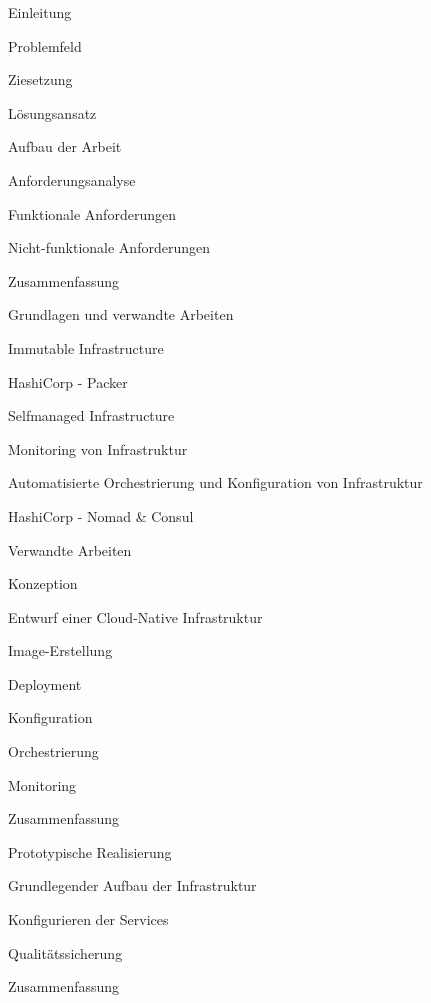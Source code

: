 \documentclass[11pt]{scrartcl}
\begin{document}
\begin{gliederung}
	\item Einleitung
	\begin{gliederung}
		\item Problemfeld
		\item Ziesetzung
		\item Lösungsansatz
		\item Aufbau der Arbeit
	\end{gliederung}

	\item Anforderungsanalyse
	\begin{gliederung}
		\item Funktionale Anforderungen
		\item Nicht-funktionale Anforderungen
		\item Zusammenfassung
	\end{gliederung}
	
	\item Grundlagen und verwandte Arbeiten
	\begin{gliederung}
		\item Immutable Infrastructure
			\item HashiCorp - Packer
		\item Selfmanaged Infrastructure
		\item Monitoring von Infrastruktur
		\item Automatisierte Orchestrierung und Konfiguration von Infrastruktur
			\item HashiCorp - Nomad \& Consul
		\item Verwandte Arbeiten
	\end{gliederung}
	
	\item Konzeption
	\begin{gliederung}
		\item Entwurf einer Cloud-Native Infrastruktur
		\begin{gliederung}
			\item Image-Erstellung
			\item Deployment
			\item Konfiguration
			\item Orchestrierung
			\item Monitoring
		\end{gliederung}
		\item Zusammenfassung
	\end{gliederung}
	
	\item Prototypische Realisierung
	\begin{gliederung}
		\item Grundlegender Aufbau der Infrastruktur
		\item Konfigurieren der Services
		\item Qualitätssicherung
		\item Zusammenfassung
	\end{gliederung}


\end{gliederung}
\end{document}
